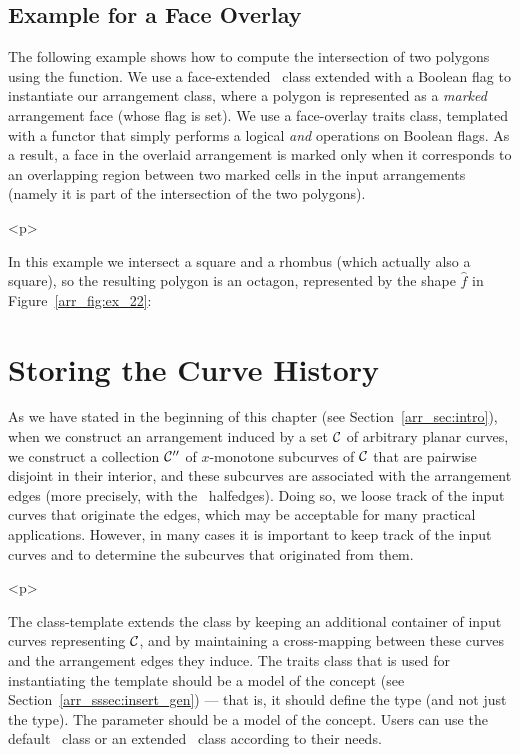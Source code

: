 
\subsection{Example for a Face Overlay}
\label{arr_ssec:face_ovl}
%
The following example shows how to compute the intersection of two polygons
using the  function. We use a face-extended \dcel\ class
extended with a Boolean flag to instantiate our arrangement class,
where a polygon is represented as a {\sl marked} arrangement face (whose
flag is set). We use a face-overlay traits class, templated with a functor
that simply performs a logical {\em and} operations on Boolean flags.
As a result, a face in the overlaid arrangement is marked only when it
corresponds to an overlapping region between two marked cells in the input
arrangements (namely it is part of the intersection of the two polygons).

\begin{ccHtmlOnly}<p>\end{ccHtmlOnly}
In this example we intersect a square and a rhombus (which actually also
a square), so the resulting polygon is an octagon, represented by the shape
$\hat{f}$ in Figure~\ref{arr_fig:ex_22}:


\section{Storing the Curve History}
\label{arr_sec:arr_with_hist}
%
As we have stated in the beginning of this chapter (see 
Section~\ref{arr_sec:intro}), when we construct an arrangement induced by
a set ${\cal C}$ of arbitrary planar curves, we construct a collection ${\cal C}''$
of $x$-monotone subcurves of ${\cal C}$ that are pairwise disjoint in their
interior, and these subcurves are associated with the arrangement edges
(more precisely, with the \dcel\ halfedges). Doing so, we loose track of the
input curves that originate the edges, which may be acceptable for many
practical applications. However, in many cases it is important to keep track
of the input curves and to determine the subcurves that originated from them.

\begin{ccHtmlOnly}<p>\end{ccHtmlOnly}
The  class-template extends
the  class by keeping an additional container of input
curves representing ${\cal C}$, and by maintaining a cross-mapping between these
curves and the arrangement edges they induce. The traits class that is
used for instantiating the template should be a model of the
 concept (see Section~\ref{arr_sssec:insert_gen}) ---
that is, it should define the  type (and not just the
 type). The  parameter should be
a model of the  concept. Users can use the default
\dcel\ class or an extended \dcel\ class according to their needs.

